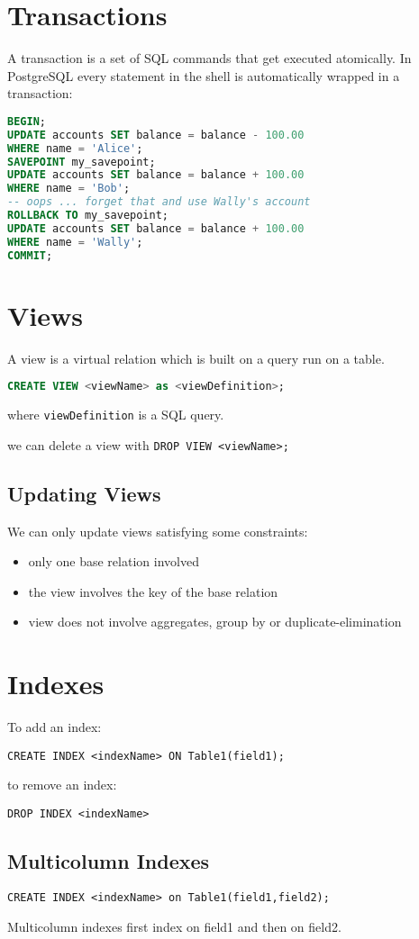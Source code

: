 \documentclass{sciposter}
\renewcommand{\t}[1]{\texttt{#1}}
\begin{document}
\begin{multicols}{3}
\section*{Transactions}


A transaction is a set of SQL commands that get executed atomically. In PostgreSQL every statement in the shell is automatically wrapped in a transaction:

\begin{lstlisting}[language=SQL]
BEGIN;
UPDATE accounts SET balance = balance - 100.00
WHERE name = 'Alice';
SAVEPOINT my_savepoint;
UPDATE accounts SET balance = balance + 100.00
WHERE name = 'Bob';
-- oops ... forget that and use Wally's account
ROLLBACK TO my_savepoint;
UPDATE accounts SET balance = balance + 100.00
WHERE name = 'Wally';
COMMIT;

\end{lstlisting}


\section*{Views}

A view is a virtual relation which is built on a query run on a table. 
\begin{lstlisting}[language=SQL]
CREATE VIEW <viewName> as <viewDefinition>;
\end{lstlisting}
where \t{viewDefinition} is a SQL query.

we can delete a view with \t{DROP VIEW <viewName>;}

\subsection*{Updating Views}

We can only update views satisfying some constraints:
\begin{itemize}
	\item only one base relation involved
	\item the view involves the key of the base relation
	\item view does not involve aggregates, group by or duplicate-elimination
\end{itemize}


\section{Indexes}

To add an index:

\t{CREATE INDEX <indexName> ON Table1(field1);}

to remove an index:

\t{DROP INDEX <indexName>}

\subsection*{Multicolumn Indexes}

\t{CREATE INDEX <indexName> on Table1(field1,field2);}

Multicolumn indexes first index on field1 and then on field2.

\newpage




\end{multicols}
\end{document}
